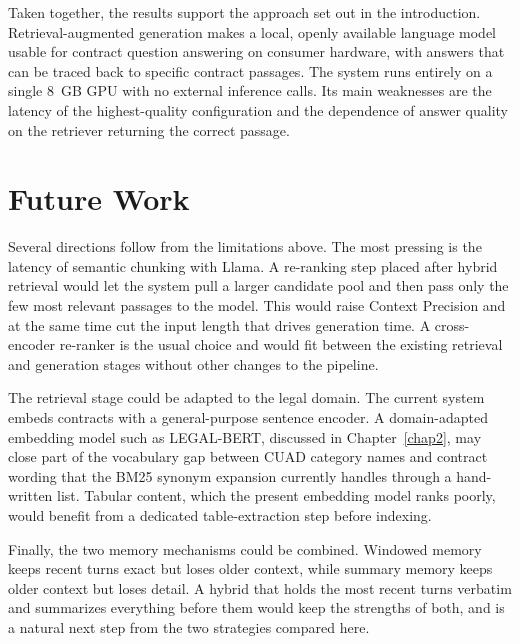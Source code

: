 Taken together, the results support the approach set out in the introduction. Retrieval-augmented generation makes a local, openly available language model usable for contract question answering on consumer hardware, with answers that can be traced back to specific contract passages. The system runs entirely on a single 8~GB GPU with no external inference calls. Its main weaknesses are the latency of the highest-quality configuration and the dependence of answer quality on the retriever returning the correct passage.


\section{Future Work}

Several directions follow from the limitations above. The most pressing is the latency of semantic chunking with Llama. A re-ranking step placed after hybrid retrieval would let the system pull a larger candidate pool and then pass only the few most relevant passages to the model. This would
raise Context Precision and at the same time cut the input length that drives generation time. A cross-encoder re-ranker is the usual choice and would fit between the existing retrieval and generation stages without other changes to the pipeline.

The retrieval stage could be adapted to the legal domain. The current system
embeds contracts with a general-purpose sentence encoder. A domain-adapted
embedding model such as LEGAL-BERT, discussed in Chapter~\ref{chap2}, may close
part of the vocabulary gap between CUAD category names and contract wording that
the BM25 synonym expansion currently handles through a hand-written list.
Tabular content, which the present embedding model ranks poorly, would benefit
from a dedicated table-extraction step before indexing.

Finally, the two memory mechanisms could be combined. Windowed memory keeps recent turns
exact but loses older context, while summary memory keeps older context but
loses detail. A hybrid that holds the most recent turns verbatim and summarizes
everything before them would keep the strengths of both, and is a natural next
step from the two strategies compared here.

